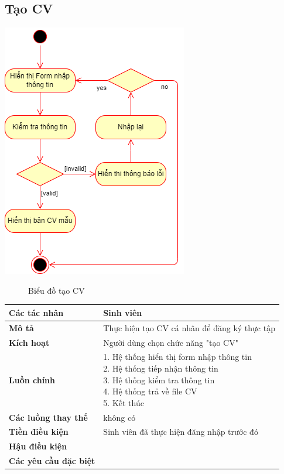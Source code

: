 \subsection{Tạo CV}
\begin{center}
	\includegraphics[width=.7\textwidth]{../drawio/activity/create_CV.png}
	\begin{figure}[h]
		\centering
		\caption{Biểu đồ tạo CV}
	\end{figure}
\end{center}
\begin{tabular}{|l|l|}
	\hline
	\textbf{Các tác nhân}         & Sinh viên                                             \\
	\hline
	\textbf{Mô tả}                & Thực hiện tạo CV cá nhân để đăng ký thực tập          \\
	\hline
	\textbf{Kích hoạt}            & Người dùng chọn chức năng "tạo CV"                    \\
	\hline
	\textbf{Luồn chính}           & \makecell[l]{1. Hệ thống hiển thị form nhập thông tin \\ 2. Hệ thống tiếp nhận thông tin \\ 3. Hệ thống kiểm tra thông tin \\ 4. Hệ thống trả về file CV \\ 5. Kết thúc} \\
	\hline
	\textbf{Các luồng thay thế}   & không có                                              \\
	\hline
	\textbf{Tiền điều kiện}       & Sinh viên đã thực hiện đăng nhập trước đó             \\
	\hline
	\textbf{Hậu điều kiện}        &                                                       \\
	\hline
	\textbf{Các yêu cầu đặc biệt} &                                                       \\
	\hline
\end{tabular}

